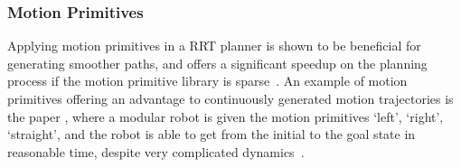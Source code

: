 \subsubsection{Motion Primitives}

Applying motion primitives in a \ac{RRT} planner is shown to be beneficial for
generating smoother paths, and offers a significant speedup on the planning
process if the motion primitive library is
sparse~\cite{vonasekGlobalMotionPlanning2013}. An example of motion primitives
offering an advantage to continuously generated motion trajectories is the paper
, where a modular robot is given
the motion primitives `left', `right', `straight', and the robot is able to get
from the initial to the goal state in reasonable time, despite very complicated
dynamics~\cite{vonasekHighlevelMotionPlanning2015}.
